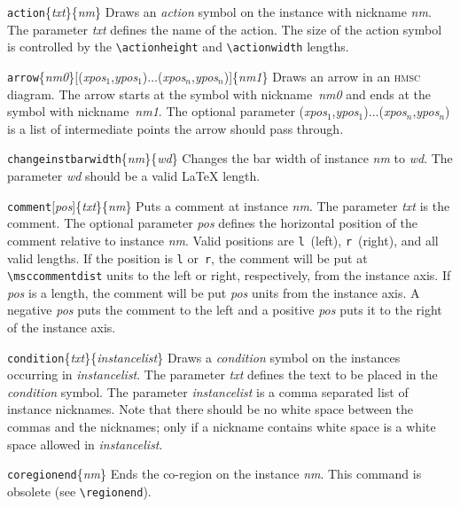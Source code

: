\documentclass[a4paper]{article}
\newcommand{\cmd}[1]{\texttt{\bslash #1}}
\newcommand{\acro}[1]{{\scshape\lowercase{#1}}}
\newcommand\HMSC{\acro{HMSC}}
\newcommand{\opt}[1]{[#1]}
\newcommand{\cmdarg}[1]{\{\emph{#1}\}}
\newcommand{\coordarg}[1]{\emph{#1}}
\newcommand{\coordargs}[2]{(\coordarg{#1},\coordarg{#2})}
\newenvironment{defs}{%
  \begin{list}{}%
              {\setlength{\labelwidth}{0pt}%
               \setlength{\labelsep}{1em}%
               \setlength{\leftmargin}{1em}%
               \setlength{\parsep}{1ex}%
               \setlength{\listparindent}{0pt}%
               \setlength{\rightmargin}{0pt}%
               \renewcommand{\makelabel}[1]{##1}%
               \raggedright%
              }%
  }{%
  \end{list}}
\begin{document}
\begin{defs}

\item[\cmd{action}\{\emph{txt}\}\{\emph{nm}\}] Draws an \emph{action}
symbol on the instance with nickname \emph{nm}. The parameter \emph{txt}
defines the name of the action. The size of the action symbol is
controlled by the \verb|\actionheight| and \verb|\actionwidth|
lengths.

\item[\cmd{arrow}\cmdarg{nm0}\opt{\coordargs{xpos${}_1$}{ypos${}_1$}$\ldots$\coordargs{xpos${}_n$}{ypos${}_n$}}\cmdarg{nm1}]
Draws an arrow in an \HMSC{} diagram. The arrow starts at the symbol
with nickname~\emph{nm0} and ends at the symbol with
nickname~\emph{nm1}. The optional parameter
\coordargs{xpos${}_1$}{ypos${}_1$}$\ldots$\coordargs{xpos${}_n$}{ypos${}_n$}
is a list of intermediate points the arrow should pass through.

\item[\cmd{changeinstbarwidth}\{\emph{nm}\}\{\emph{wd}\}] Changes the
bar width of instance \emph{nm} to \emph{wd}. The parameter \emph{wd}
should be a valid \LaTeX{} length.

\item[\cmd{comment}\opt{\emph{pos}}\{\emph{txt}\}\{\emph{nm}\}] Puts a
comment at instance \emph{nm}. The parameter \emph{txt} is the
comment. The optional parameter \emph{pos} defines the horizontal
position of the comment relative to instance \emph{nm}. Valid
positions are \verb|l|~(left), \verb|r|~(right), and all valid
lengths. If the position is \verb|l| or~\verb|r|, the comment will be
put at \verb|\msccommentdist| units to the left or right, respectively, from
the instance axis. If \emph{pos} is a length, the comment will be put
\emph{pos} units from the instance axis. A negative \emph{pos} puts the
comment to the left and a positive \emph{pos} puts it to the right of
the instance axis.

\item[\cmd{condition}\{\emph{txt}\}\{\emph{instancelist}\}] Draws a
\emph{condition} symbol on the instances occurring in
\emph{instancelist}. The parameter \emph{txt} defines the text to be
placed in the \emph{condition} symbol. The parameter
\emph{instancelist} is a comma separated list of instance
nicknames. Note that there should be no white space between the commas
and the nicknames; only if a nickname contains white space is a white
space allowed in \emph{instancelist}.

\item[\cmd{coregionend}\{\emph{nm}\}] Ends the co-region on the instance
\emph{nm}. This command is obsolete (see \verb|\regionend|).


\end{defs}
\end{document}
